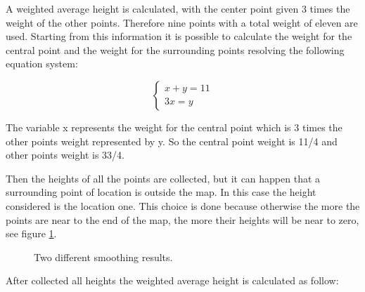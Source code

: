 \documentclass[12pt]{article}
\begin{document}
    \noindent
    A weighted average height is calculated, with the center point given 3 times the weight of the other points. Therefore nine points with a total weight of eleven are used.
    Starting from this information it is possible to calculate the weight for the central point and the weight for the surrounding points resolving the following equation system:

    \begin{equation}
        \begin{cases}
            x + y = 11
            \\ 3x = y
        \end{cases}
    \end{equation}

    \noindent
    The variable x represents the weight for the central point which is 3 times the other points weight represented by y. So the central point weight is 11/4 and other points weight is 33/4.

    Then the heights of all the points are collected, but it can happen that a surrounding point of location is outside the map. In this case the height considered  is the location one. 
    This choice is done because otherwise the more the points are near to the end of the map, the more their heights will be near to zero, see figure \ref{fig:SmotthingCamparison}.
    
    \begin{figure}
        \centering     %
        \caption{Two different smoothing results.}
        \label{fig:SmotthingCamparison}
    \end{figure}
        
    
    After collected all heights the weighted average height is calculated as follow:
\end{document}
